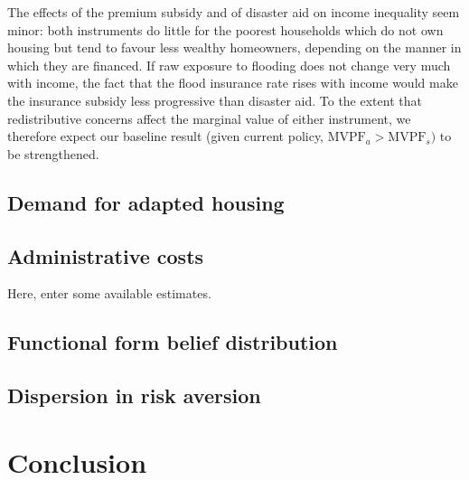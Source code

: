\documentclass[12pt]{article}
\begin{document}
The effects of the premium subsidy and of disaster aid on income inequality seem minor: both instruments do little for the poorest households which do not own housing but tend to favour less wealthy homeowners, depending on the manner in which they are financed. If raw exposure to flooding does not change very much with income, the fact that the flood insurance rate rises with income would make the insurance subsidy less progressive than disaster aid. To the extent that redistributive concerns affect the marginal value of either instrument, we therefore expect our baseline result (given current policy, $\text{MVPF}_a>\text{MVPF}_s)$ to be strengthened.

\subsection{Demand for adapted housing}

\subsection{Administrative costs}\label{subsec:admincosts}

Here, enter some available estimates. 

\subsection{Functional form belief distribution}

\subsection{Dispersion in risk aversion}
\section{Conclusion}
\label{sec:conclusion}



\end{document}
